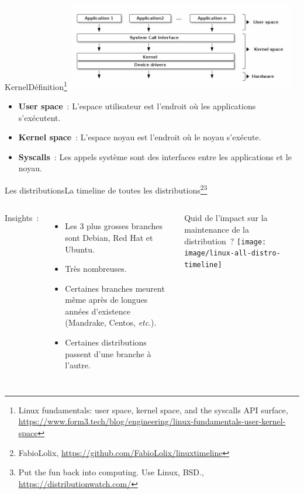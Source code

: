 \documentclass{beamer}
\begin{document}
    \begin{frame}{Kernel}{Définition\footnote{Linux fundamentals: user space, kernel space, and the syscalls API surface, \url{https://www.form3.tech/blog/engineering/linux-fundamentals-user-kernel-space}}}
        \centering
        \includegraphics[width=10cm]{image/kernel}
        \flushleft
        \begin{itemize}
            \item \textbf{User space}~: L'espace utilisateur est l'endroit où les applications s'exécutent.
            \item \textbf{Kernel space}~: L'espace noyau est l'endroit où le noyau s'exécute.
            \item \textbf{Syscalls}~: Les appels système sont des interfaces entre les applications et le noyau.
        \end{itemize}
    \end{frame}

    \begin{frame}{Les distributions}{La timeline de toutes les distributions\footnote{FabioLolix, \url{https://github.com/FabioLolix/linuxtimeline}}\footnotestep\footnote{Put the fun back into computing. Use Linux, BSD., \url{https://distributionwatch.com/}}}
        \begin{columns}
            Insights~:
            \begin{itemize}
                \item Les 3 plus grosses branches sont Debian, Red Hat et Ubuntu.
                \item Très nombreuses.
                \item Certaines branches meurent même après de longues années d'existence (Mandrake, Centos, \textit{etc}.).
                \item Certaines distributions passent d'une branche à l'autre.
            \end{itemize}
            Quid de l'impact sur la maintenance de la distribution~?
            \centering
            \texttt{[image: image/linux-all-distro-timeline]}
        \end{columns}
    \end{frame}
\end{document}
